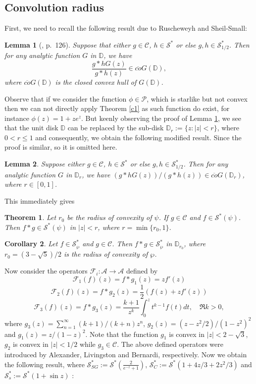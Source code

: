 \documentclass[12pt, reqno]{amsart}
\numberwithin{equation}{section}
\theoremstyle{plain}
\newtheorem{theorem}{Theorem}[section]
\newtheorem{corollary}[theorem]{Corollary}
\newtheorem{lemma}{Lemma}[section]
\theoremstyle{definition}
\theoremstyle{remark}
\begin{document}
\subsection{Convolution radius}
First, we need to recall the following result due to Ruscheweyh and Sheil-Small:
\begin{lemma}[\cite{rush-sheil-1973}, p.~126]\label{l1}
	Suppose that either	$g\in \mathcal{C}$, $h\in \mathcal{S}^*$ or else $g,h\in\mathcal{S}^*_{1/2}$. Then for any analytic function $G$ in $\mathbb{D}$, we have
	$$\frac{g*hG(z)}{g*h(z)}\in\overline{co}G(\mathbb{D}),$$
	where $\overline{co}G(\mathbb{D})$ is the closed convex hull of $G(\mathbb{D})$.
\end{lemma}
Observe that if we consider the function $\phi\in\mathcal{P}$, which is starlike but not convex then we can not directly apply Theorem \ref{c1} as such function do exist, for instance $\phi(z)=1+ze^z$. But keenly observing the proof of Lemma \ref{l1}, we see that the unit disk $\mathbb{D}$ can be replaced by the sub-disk $\mathbb{D}_{r} :=\{z: |z|<r \}$, where $0<r\leq1$ and consequently, we obtain the following modified result. Since the proof is similar, so it is omitted here.
\begin{lemma}\label{l11}
	Suppose either	$g\in \mathcal{C}$, $h\in \mathcal{S}^*$ or else $g,h\in\mathcal{S}^*_{1/2}$. Then for any analytic function $G$ in $\mathbb{D}_{r}$, we have
	$({g*hG(z)})/({g*h(z)})\in\overline{co}G(\mathbb{D}_{r})$, where $r\in[0,1]$.
\end{lemma}
This immediately gives 
\begin{theorem}\label{c11}
	Let $r_0$ be the radius of convexity of $\psi$. If $g\in \mathcal{C}$ and $f\in\mathcal{S}^*(\psi)$. Then
	$f*g\in \mathcal{S}^*(\psi)$
	in $|z|<r$, where $r=\min\{r_0,1\}$.
\end{theorem}
\begin{corollary}
	Let $f\in\mathcal{S}^{*}_{\wp}$ and $g\in \mathcal{C}$. Then $f*g\in\mathcal{S}^{*}_{\wp}$ in $\mathbb{D}_{r_0}$, where $r_0=(3-\sqrt{5})/2$ is the radius of convexity of $\wp$.
\end{corollary}	
Now consider the operators $\mathcal{F}_i :\mathcal{A}\rightarrow \mathcal{A}$ defined by
$$\mathcal{F}_1(f)(z)=f*g_1(z)=zf'(z)$$
$$\mathcal{F}_2(f)(z)=f*g_2(z)=\frac{1}{2}(f(z)+zf'(z))$$
\begin{equation*}\label{operators}
\mathcal{F}_3(f)(z)=f*g_3(z)=\frac{k+1}{z^k}\int_{0}^{z}t^{k-1}f(t)dt,\quad \Re{k}>0,
\end{equation*}
where 
$g_3(z)=\sum_{n=1}^{\infty}{(k+1)}/{(k+n)}z^n$, $g_2(z)=(z-z^2/2)/(1-z^2)^2$ and $g_1(z)=z/(1-z)^2$. Note that the function $g_1$ is convex in $|z|<2-\sqrt{3}$, $g_2$ is convex in $|z|<1/2$ while $g_3\in \mathcal{C}$.
The above defined operators were introduced by Alexander, Livingston and Bernardi, respectively. Now we obtain the following result, where $\mathcal{S}^*_{SG}:=\mathcal{S}^*(\frac{2}{e^{-z}+1})$, $\mathcal{S}^*_{C}:=\mathcal{S}^*(1+4z/3+2z^2/3)$ and $\mathcal{S}^*_{s}:=\mathcal{S}^*(1+\sin{z})$ :
\end{document}
